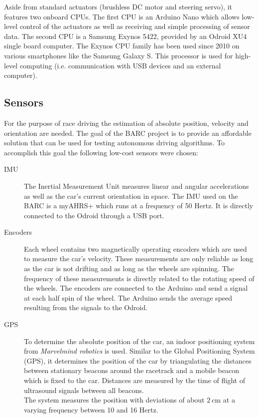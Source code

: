 Aside from standard actuators (brushless DC motor and steering servo), it features two onboard CPUs. The first CPU is an Arduino Nano which allows low-level control of the actuators as well as receiving and simple processing of sensor data. The second CPU is a Samsung Exynos 5422, provided by an Odroid XU4 single board computer. The Exynos CPU family has been used since 2010 on various smartphones like the Samsung Galaxy S. This processor is used for high-level computing (i.e. communication with USB devices and an external computer).
\subsection{Sensors}
For the purpose of race driving the estimation of absolute position, velocity and orientation are needed. The goal of the BARC project is to provide an affordable solution that can be used for testing autonomous driving algorithms. To accomplish this goal the following low-cost  sensors were chosen:
\begin{description}
\item[IMU] The Inertial Measurement Unit measures linear and angular accelerations as well as the car's current orientation in space. The IMU used on the BARC is a myAHRS+ which runs at a frequency of 50 Hertz. It is directly connected to the Odroid through a USB port.
\item[Encoders] Each wheel contains two magnetically operating encoders which are used to measure the car's velocity. These measurements are only reliable as long as the car is not drifting and as long as the wheels are spinning. The frequency of these measurements is directly related to the rotating speed of the wheels. The encoders are connected to the Arduino and send a signal at each half spin of the wheel. The Arduino sends the average speed resulting from the signals to the Odroid.
\item[GPS] To determine the absolute position of the car, an indoor positioning system from \emph{Marvelmind robotics} \cite{marvelmind} is used. Similar to the Global Positioning System (GPS), it determines the position of the car by triangulating the distances between stationary beacons around the racetrack and a mobile beacon which is fixed to the car. Distances are measured by the time of flight of ultrasound signals between all beacons.\\
The system measures the position with deviations of about $\SI{2}{\centi\meter}$ at a varying frequency between 10 and 16 Hertz.
\end{description}


